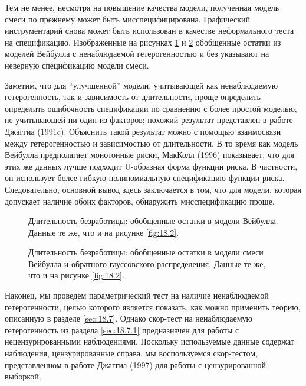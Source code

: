 Тем не менее, несмотря на повышение качества модели, полученная модель смеси по прежнему может быть мисспецифицирована. Графический инструментарий снова может быть использован в качестве неформального теста на спецификацию. Изображенные на рисунках \ref{fig:18.4} и \ref{fig:18.5} обобщенные остатки из моделей Вейбулла с ненаблюдаемой гетерогенностью и без указывают на неверную спецификацию модели смеси.

Заметим, что для ``улучшенной'' модели, учитывающей как ненаблюдаемую гетерогенность, так и зависимость от длительности, проще определить определить ошибочность спецификации по сравнению с более простой моделью, не учитывающей ни один из факторов; похожий результат представлен в работе Джаггиа (1991c). Объяснить такой результат можно с помощью взаимосвязи между гетерогенностью и зависимостью от длительности. В то время как модель Вейбулла предполагает монотонные риски, МакКолл (1996) показывает, что для этих же данных лучше подходит U-образная форма функции риска. В частности, он использует более гибкую полиномиальную спецификацию функции риска. Следовательно, основной вывод здесь заключается в том, что для модели, которая допускает наличие обоих факторов, обнаружить мисспецификацию проще.

\begin{figure}[ht!]\caption{Длительность безработицы: обобщенные остатки в модели Вейбулла. Данные те же, что и на рисунке \ref{fig:18.2}.}\label{fig:18.4}
\centering
\end{figure}

\begin{figure}[ht!]\caption{Длительность безработицы: обобщенные остатки в модели смеси Вейбулла и обратного гауссовского распределения. Данные те же, что и на рисунке \ref{fig:18.2}.}\label{fig:18.5}
\centering
\end{figure}

Наконец, мы проведем параметрический тест на наличие ненаблюдаемой гетерогенности, целью которого является показать, как можно применить теорию, описанную в разделе \ref{sec:18.7}. Однако скор-тест на ненаблюдаемую гетерогенность из раздела \ref{sec:18.7.1} предназначен для работы с нецензурированными наблюдениями. Поскольку используемые данные содержат наблюдения, цензурированные справа, мы воспользуемся скор-тестом, представленном в работе Джаггиа (1997) для работы с цензурированной выборкой.

